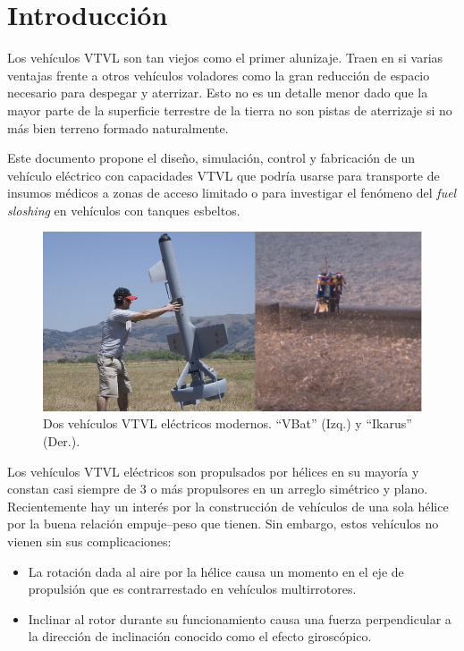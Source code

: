 \section{Introducción}

Los vehículos VTVL son tan viejos como el primer alunizaje. Traen en si varias ventajas frente a otros vehículos voladores como la gran reducción de espacio necesario para despegar y aterrizar. Esto no es un detalle menor dado que la mayor parte de la superficie terrestre de la tierra no son pistas de aterrizaje si no más bien terreno formado naturalmente.

Este documento propone el diseño, simulación, control y fabricación de un vehículo eléctrico con capacidades VTVL que podría usarse para transporte de insumos médicos a zonas de acceso limitado o para investigar el fenómeno del \textit{fuel sloshing} en vehículos con tanques esbeltos.

\begin{figure}[htb]
    \centering
    \includegraphics[width=0.8\linewidth]{fig/vbat_icarus.png}
    \caption{Dos vehículos VTVL eléctricos modernos. ``VBat'' (Izq.) y ``Ikarus'' (Der.).}
    \label{fig:vbat_icarus}
\end{figure}

Los vehículos VTVL eléctricos son propulsados por hélices en su mayoría y constan casi siempre de 3 o más propulsores en un arreglo simétrico y plano. Recientemente hay un interés por la construcción de vehículos de una sola hélice por la buena relación empuje--peso que tienen. Sin embargo, estos vehículos no vienen sin sus complicaciones: 

\begin{itemize}
    \item La rotación dada al aire por la hélice causa un momento en el eje de propulsión que es contrarrestado en vehículos multirrotores.
    \item Inclinar al rotor durante su funcionamiento causa una fuerza perpendicular a la dirección de inclinación conocido como el efecto giroscópico. 
\end{itemize}

